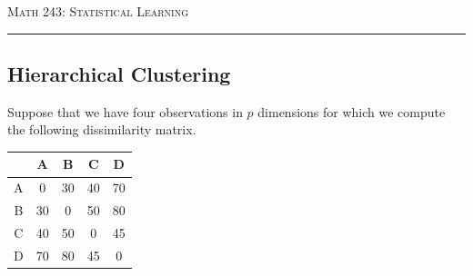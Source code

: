 \documentclass{article}\usepackage[]{graphicx}\usepackage[]{color}
\begin{document}
\begin{center}
\textsc{Math 243: Statistical Learning} \\
\noindent\rule{12cm}{.5pt}
\end{center}

\subsection*{Hierarchical Clustering}

Suppose that we have four observations in $p$ dimensions for which we compute the following dissimilarity matrix.

{\renewcommand{\arraystretch}{1.75}
\begin{center}
  \begin{tabular}{ c | c | c | c | c |}
     & A & B & C & D \\ \hline
    A & 0 & 30 & 40 & 70 \\ \hline
    B & 30 & 0 & 50 & 80 \\ \hline
    C & 40 & 50 & 0 & 45 \\ \hline
    D & 70 & 80 & 45 & 0 \\ \hline
  \end{tabular}
\end{center}
}

\vspace{3mm}
\end{document}
